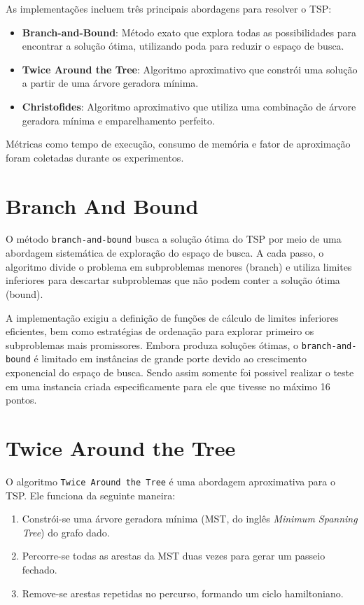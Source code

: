 \documentclass[12pt]{article}
\begin{document}
As implementações incluem três principais abordagens para resolver o TSP:

\begin{itemize}
  \item \textbf{Branch-and-Bound}: Método exato que explora todas as possibilidades para encontrar a solução ótima, utilizando poda para reduzir o espaço de busca.
  \item \textbf{Twice Around the Tree}: Algoritmo aproximativo que constrói uma solução a partir de uma árvore geradora mínima.
  \item \textbf{Christofides}: Algoritmo aproximativo que utiliza uma combinação de árvore geradora mínima e emparelhamento perfeito.
\end{itemize}

Métricas como tempo de execução, consumo de memória e fator de aproximação foram coletadas durante os experimentos.

\section{Branch And Bound}

O método \texttt{branch-and-bound} busca a solução ótima do TSP por meio de uma abordagem sistemática de exploração do espaço de busca. A cada passo, o algoritmo divide o problema em subproblemas menores (branch) e utiliza limites inferiores para descartar subproblemas que não podem conter a solução ótima (bound).

A implementação exigiu a definição de funções de cálculo de limites inferiores eficientes, bem como estratégias de ordenação para explorar primeiro os subproblemas mais promissores. Embora produza soluções ótimas, o \texttt{branch-and-bound} é limitado em instâncias de grande porte devido ao crescimento exponencial do espaço de busca. Sendo assim somente foi possivel realizar o teste em uma instancia criada especificamente para ele que tivesse no máximo 16 pontos.

\section{Twice Around the Tree}

O algoritmo \texttt{Twice Around the Tree} é uma abordagem aproximativa para o TSP. Ele funciona da seguinte maneira:

\begin{enumerate}
  \item Constrói-se uma árvore geradora mínima (MST, do inglês \textit{Minimum Spanning Tree}) do grafo dado.
  \item Percorre-se todas as arestas da MST duas vezes para gerar um passeio fechado.
  \item Remove-se arestas repetidas no percurso, formando um ciclo hamiltoniano.
\end{enumerate}
\end{document}
